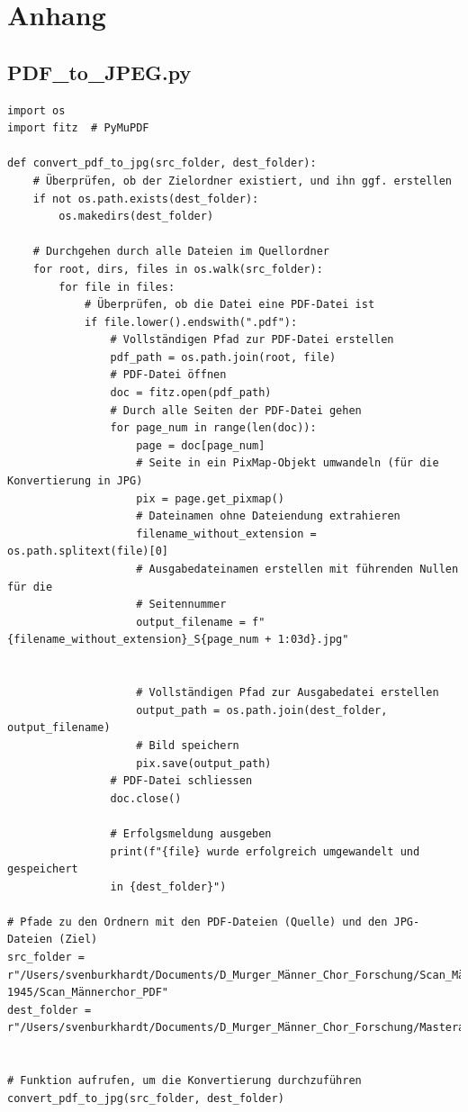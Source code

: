 \documentclass[12pt, a4paper, ngerman, bidi=default]{article}
\begin{document}
\newpage
\appendix
\section{Anhang}
\begingroup
\small
\subsection{PDF\_to\_JPEG.py}\label{section:PDF_to_JPEG}
\begin{verbatim}
import os
import fitz  # PyMuPDF

def convert_pdf_to_jpg(src_folder, dest_folder):
    # Überprüfen, ob der Zielordner existiert, und ihn ggf. erstellen
    if not os.path.exists(dest_folder):
        os.makedirs(dest_folder)

    # Durchgehen durch alle Dateien im Quellordner
    for root, dirs, files in os.walk(src_folder):
        for file in files:
            # Überprüfen, ob die Datei eine PDF-Datei ist
            if file.lower().endswith(".pdf"):
                # Vollständigen Pfad zur PDF-Datei erstellen
                pdf_path = os.path.join(root, file)
                # PDF-Datei öffnen
                doc = fitz.open(pdf_path)
                # Durch alle Seiten der PDF-Datei gehen
                for page_num in range(len(doc)):
                    page = doc[page_num]
                    # Seite in ein PixMap-Objekt umwandeln (für die Konvertierung in JPG)
                    pix = page.get_pixmap()
                    # Dateinamen ohne Dateiendung extrahieren
                    filename_without_extension = os.path.splitext(file)[0]
                    # Ausgabedateinamen erstellen mit führenden Nullen für die 
                    # Seitennummer
                    output_filename = f"{filename_without_extension}_S{page_num + 1:03d}.jpg"


                    # Vollständigen Pfad zur Ausgabedatei erstellen
                    output_path = os.path.join(dest_folder, output_filename)
                    # Bild speichern
                    pix.save(output_path)
                # PDF-Datei schliessen
                doc.close()
                
                # Erfolgsmeldung ausgeben
                print(f"{file} wurde erfolgreich umgewandelt und gespeichert
                in {dest_folder}")

# Pfade zu den Ordnern mit den PDF-Dateien (Quelle) und den JPG-Dateien (Ziel)
src_folder = r"/Users/svenburkhardt/Documents/D_Murger_Männer_Chor_Forschung/Scan_Männerchor/Männerchor_Akten_1925–1945/Scan_Männerchor_PDF"
dest_folder = r"/Users/svenburkhardt/Documents/D_Murger_Männer_Chor_Forschung/Masterarbeit/JPEG_Akten_Scans"


# Funktion aufrufen, um die Konvertierung durchzuführen
convert_pdf_to_jpg(src_folder, dest_folder)

\end{verbatim}
\end{document}

